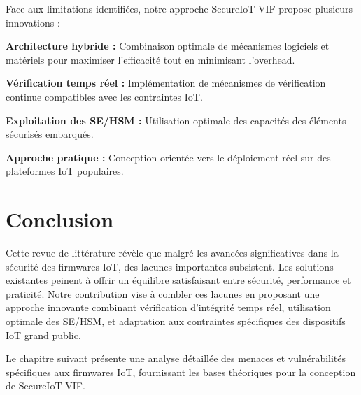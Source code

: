 Face aux limitations identifiées, notre approche SecureIoT-VIF propose plusieurs innovations :

\textbf{Architecture hybride :} Combinaison optimale de mécanismes logiciels et matériels pour maximiser l'efficacité tout en minimisant l'overhead.

\textbf{Vérification temps réel :} Implémentation de mécanismes de vérification continue compatibles avec les contraintes IoT.

\textbf{Exploitation des SE/HSM :} Utilisation optimale des capacités des éléments sécurisés embarqués.

\textbf{Approche pratique :} Conception orientée vers le déploiement réel sur des plateformes IoT populaires.

\section{Conclusion}

Cette revue de littérature révèle que malgré les avancées significatives dans la sécurité des firmwares IoT, des lacunes importantes subsistent. Les solutions existantes peinent à offrir un équilibre satisfaisant entre sécurité, performance et praticité. Notre contribution vise à combler ces lacunes en proposant une approche innovante combinant vérification d'intégrité temps réel, utilisation optimale des SE/HSM, et adaptation aux contraintes spécifiques des dispositifs IoT grand public.

Le chapitre suivant présente une analyse détaillée des menaces et vulnérabilités spécifiques aux firmwares IoT, fournissant les bases théoriques pour la conception de SecureIoT-VIF.